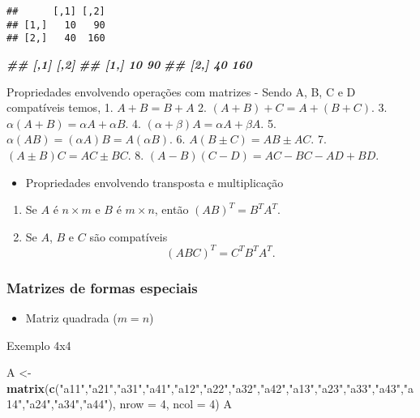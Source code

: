 \documentclass[
]{article}
\newenvironment{Shaded}{\begin{snugshade}}{\end{snugshade}}
\newcommand{\AttributeTok}[1]{\textcolor[rgb]{0.13,0.29,0.53}{#1}}
\newcommand{\DecValTok}[1]{\textcolor[rgb]{0.00,0.00,0.81}{#1}}
\newcommand{\DocumentationTok}[1]{\textcolor[rgb]{0.56,0.35,0.01}{\textbf{\textit{#1}}}}
\newcommand{\FunctionTok}[1]{\textcolor[rgb]{0.13,0.29,0.53}{\textbf{#1}}}
\newcommand{\NormalTok}[1]{#1}
\newcommand{\OtherTok}[1]{\textcolor[rgb]{0.56,0.35,0.01}{#1}}
\newcommand{\StringTok}[1]{\textcolor[rgb]{0.31,0.60,0.02}{#1}}
\providecommand{\tightlist}{%
  \setlength{\itemsep}{0pt}\setlength{\parskip}{0pt}}
\begin{document}
\begin{verbatim}
##      [,1] [,2]
## [1,]   10   90
## [2,]   40  160
\end{verbatim}

\begin{Shaded}
\begin{Highlighting}[]
\DocumentationTok{\#\# [,1] [,2]}
\DocumentationTok{\#\# [1,] 10 90}
\DocumentationTok{\#\# [2,] 40 160}
\end{Highlighting}
\end{Shaded}

Propriedades envolvendo operações com matrizes - Sendo A, B, C e D
compatíveis temos, 1. \(A + B = B + A\) 2.
\((A + B) + C = A + (B + C)\). 3.
\(\alpha (A + B) = \alpha A + \alpha B\). 4.
\((\alpha + \beta )A = \alpha A + \beta A\). 5.
\(\alpha (AB) = (\alpha A)B = A(\alpha B)\). 6. \(A(B ± C) = AB ± AC\).
7. \((A ± B)C = AC ± BC\). 8. \((A-B)(C-D) = AC-BC-AD+BD\).

\begin{itemize}
\tightlist
\item
  Propriedades envolvendo transposta e multiplicação
\end{itemize}

\begin{enumerate}
\def\labelenumi{\arabic{enumi}.}
\tightlist
\item
  Se \(A\) é \(n \times m\) e \(B\) é \(m \times n\), então
  \((AB)^T = B^T A^T\).
\item
  Se \(A\), \(B\) e \(C\) são compatíveis \[
  (ABC)^{T}= C^{T}B^{T}A^{T}.
  \]
\end{enumerate}

\hypertarget{matrizes-de-formas-especiais}{%
\subsubsection{Matrizes de formas
especiais}\label{matrizes-de-formas-especiais}}

\begin{itemize}
\tightlist
\item
  Matriz quadrada (\(m = n\))
\end{itemize}

Exemplo 4x4

\begin{Shaded}
\begin{Highlighting}[]
\NormalTok{A }\OtherTok{\textless{}{-}} \FunctionTok{matrix}\NormalTok{(}\FunctionTok{c}\NormalTok{(}\StringTok{"a11"}\NormalTok{,}\StringTok{"a21"}\NormalTok{,}\StringTok{"a31"}\NormalTok{,}\StringTok{"a41"}\NormalTok{,}\StringTok{"a12"}\NormalTok{,}\StringTok{"a22"}\NormalTok{,}\StringTok{"a32"}\NormalTok{,}\StringTok{"a42"}\NormalTok{,}\StringTok{"a13"}\NormalTok{,}\StringTok{"a23"}\NormalTok{,}\StringTok{"a33"}\NormalTok{,}\StringTok{"a43"}\NormalTok{,}\StringTok{"a14"}\NormalTok{,}\StringTok{"a24"}\NormalTok{,}\StringTok{"a34"}\NormalTok{,}\StringTok{"a44"}\NormalTok{), }\AttributeTok{nrow =} \DecValTok{4}\NormalTok{, }\AttributeTok{ncol =} \DecValTok{4}\NormalTok{)}
\NormalTok{A}
\end{Highlighting}
\end{Shaded}
\end{document}
